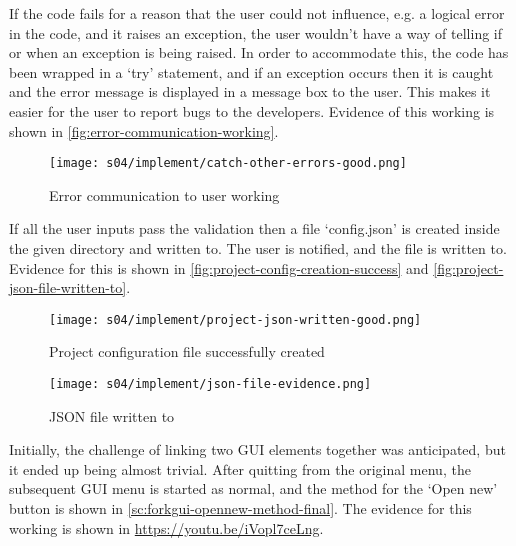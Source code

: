         If the code fails for a reason that the user could not influence, e.g. a logical error in the code, and it raises an exception, the user wouldn't have a way of telling if or when an exception is being raised. 
        In order to accommodate this, the code has been wrapped in a `try' statement, and if an exception occurs then it is caught and the error message is displayed in a message box to the user. 
        This makes it easier for the user to report bugs to the developers.
        Evidence of this working is shown in \autoref{fig:error-communication-working}.

        \begin{figure}[!ht]
            \centering
            \texttt{[image: s04/implement/catch-other-errors-good.png]}
            \caption{Error communication to user working}
            \label{fig:error-communication-working}
        \end{figure}

        If all the user inputs pass the validation then a file `config.json' is created inside the given directory and written to. The user is notified, and the file is written to. 
        Evidence for this is shown in \autoref{fig:project-config-creation-success} and \autoref{fig:project-json-file-written-to}. 



        \begin{figure}[!ht]
            \centering
            \texttt{[image: s04/implement/project-json-written-good.png]}
            \caption{Project configuration file successfully created}
            \label{fig:project-config-creation-success}
        \end{figure}

        \begin{figure}[!ht]
            \centering
            \texttt{[image: s04/implement/json-file-evidence.png]}
            \caption{JSON file written to}
            \label{fig:project-json-file-written-to}
        \end{figure}

        Initially, the challenge of linking two GUI elements together was anticipated, but it ended up being almost trivial. 
        After quitting from the original menu, the subsequent GUI menu is started as normal, and the method for the `Open new' button is shown in \autoref{sc:forkgui-opennew-method-final}. 
        The evidence for this working is shown in \url{https://youtu.be/iVopl7ceLng}.

